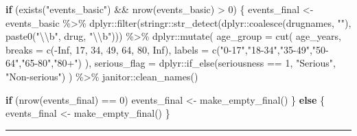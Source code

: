 \documentclass[
  letterpaper,
  DIV=11,
  numbers=noendperiod]{scrartcl}
\newenvironment{Shaded}{\begin{snugshade}}{\end{snugshade}}
\newcommand{\AttributeTok}[1]{\textcolor[rgb]{0.40,0.45,0.13}{#1}}
\newcommand{\ConstantTok}[1]{\textcolor[rgb]{0.56,0.35,0.01}{#1}}
\newcommand{\ControlFlowTok}[1]{\textcolor[rgb]{0.00,0.23,0.31}{\textbf{#1}}}
\newcommand{\DecValTok}[1]{\textcolor[rgb]{0.68,0.00,0.00}{#1}}
\newcommand{\FunctionTok}[1]{\textcolor[rgb]{0.28,0.35,0.67}{#1}}
\newcommand{\NormalTok}[1]{\textcolor[rgb]{0.00,0.23,0.31}{#1}}
\newcommand{\OtherTok}[1]{\textcolor[rgb]{0.00,0.23,0.31}{#1}}
\newcommand{\SpecialCharTok}[1]{\textcolor[rgb]{0.37,0.37,0.37}{#1}}
\newcommand{\StringTok}[1]{\textcolor[rgb]{0.13,0.47,0.30}{#1}}
\begin{document}
\begin{Shaded}
\begin{Highlighting}[]
\ControlFlowTok{if}\NormalTok{ (}\FunctionTok{exists}\NormalTok{(}\StringTok{"events\_basic"}\NormalTok{) }\SpecialCharTok{\&\&} \FunctionTok{nrow}\NormalTok{(events\_basic) }\SpecialCharTok{\textgreater{}} \DecValTok{0}\NormalTok{) \{}
\NormalTok{  events\_final }\OtherTok{\textless{}{-}}\NormalTok{ events\_basic }\SpecialCharTok{\%\textgreater{}\%}
\NormalTok{    dplyr}\SpecialCharTok{::}\FunctionTok{filter}\NormalTok{(stringr}\SpecialCharTok{::}\FunctionTok{str\_detect}\NormalTok{(dplyr}\SpecialCharTok{::}\FunctionTok{coalesce}\NormalTok{(drugnames, }\StringTok{""}\NormalTok{), }\FunctionTok{paste0}\NormalTok{(}\StringTok{"}\SpecialCharTok{\textbackslash{}\textbackslash{}}\StringTok{b"}\NormalTok{, drug, }\StringTok{"}\SpecialCharTok{\textbackslash{}\textbackslash{}}\StringTok{b"}\NormalTok{))) }\SpecialCharTok{\%\textgreater{}\%}
\NormalTok{    dplyr}\SpecialCharTok{::}\FunctionTok{mutate}\NormalTok{(}
      \AttributeTok{age\_group =} \FunctionTok{cut}\NormalTok{(}
\NormalTok{        age\_years,}
        \AttributeTok{breaks =} \FunctionTok{c}\NormalTok{(}\SpecialCharTok{{-}}\ConstantTok{Inf}\NormalTok{, }\DecValTok{17}\NormalTok{, }\DecValTok{34}\NormalTok{, }\DecValTok{49}\NormalTok{, }\DecValTok{64}\NormalTok{, }\DecValTok{80}\NormalTok{, }\ConstantTok{Inf}\NormalTok{),}
        \AttributeTok{labels =} \FunctionTok{c}\NormalTok{(}\StringTok{"0{-}17"}\NormalTok{,}\StringTok{"18{-}34"}\NormalTok{,}\StringTok{"35{-}49"}\NormalTok{,}\StringTok{"50{-}64"}\NormalTok{,}\StringTok{"65{-}80"}\NormalTok{,}\StringTok{"80+"}\NormalTok{)}
\NormalTok{      ),}
      \AttributeTok{serious\_flag =}\NormalTok{ dplyr}\SpecialCharTok{::}\FunctionTok{if\_else}\NormalTok{(seriousness }\SpecialCharTok{==} \DecValTok{1}\NormalTok{, }\StringTok{"Serious"}\NormalTok{, }\StringTok{"Non{-}serious"}\NormalTok{)}
\NormalTok{    ) }\SpecialCharTok{\%\textgreater{}\%}
\NormalTok{    janitor}\SpecialCharTok{::}\FunctionTok{clean\_names}\NormalTok{()}

  \ControlFlowTok{if}\NormalTok{ (}\FunctionTok{nrow}\NormalTok{(events\_final) }\SpecialCharTok{==} \DecValTok{0}\NormalTok{) events\_final }\OtherTok{\textless{}{-}} \FunctionTok{make\_empty\_final}\NormalTok{()}
\NormalTok{\} }\ControlFlowTok{else}\NormalTok{ \{}
\NormalTok{  events\_final }\OtherTok{\textless{}{-}} \FunctionTok{make\_empty\_final}\NormalTok{()}
\NormalTok{\}}
\end{Highlighting}
\end{Shaded}

\begin{center}\rule{0.5\linewidth}{0.5pt}\end{center}
\end{document}
